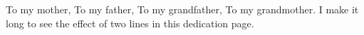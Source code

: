 \TAMUDedicationFormat
\begin{center}
\vspace*{\fill}
To my mother, To my father, To my grandfather, To my grandmother. I make it long to see the effect of two lines in this dedication page.
\vspace*{\fill}
\end{center}



